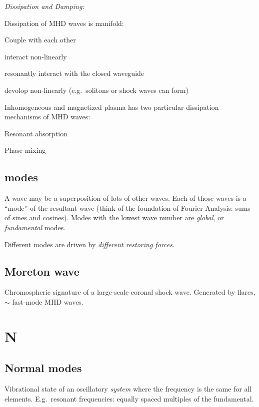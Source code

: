 \documentclass[12pt]{article}
\begin{document}
\begin{itemize*}
\emph{Dissipation and Damping:}

    \item Dissipation of MHD waves is manifold:
        \begin{itemize*}
            \item Couple with each other
            \item interact non-linearly
            \item resonantly interact with the closed waveguide
            \item devolop non-linearly (e.g.\ solitons or shock waves
                can form)
        \end{itemize*}
    \item Inhomogeneous and magnetized plasma has two particular
        dissipation mechanisms of MHD waves:
        \begin{itemize*}
            \item Resonant absorption
            \item Phase mixing
        \end{itemize*}
\end{itemize*}


\subsection*{modes}
A wave may be a superposition of lots of other waves. Each of those
waves is a ``mode'' of the resultant wave (think of the foundation
of Fourier Analysis: sums of sines and cosines).
Modes with the lowest wave number are \emph{global}, or
\emph{fundamental} modes.
\begin{itemize*}
    \item Different modes are driven by \emph{different restoring forces}.
\end{itemize*}

\subsection*{Moreton wave}
Chromospheric signature of a large-scale coronal shock wave. Generated
by flares, $\sim$ fast-mode MHD waves.

\section*{N}
\subsection*{Normal modes}
Vibrational state of an oscillatory \emph{system} where the frequency
is the same for all elements. E.g.\ resonant frequencies: equally
spaced multiples of the fundamental.
\end{document}
